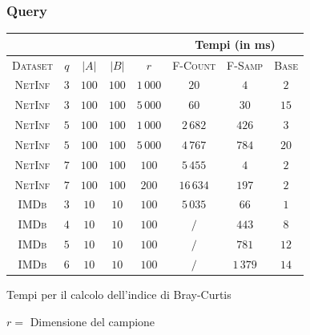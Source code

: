 \begin{frame}
	\frametitle{Query}
	\centering
	\begin{table}[ht]
		\centering
		\begin{tabular}{|c|c|c|c|c|c|c|c|}
			\cline{6-8}
			\multicolumn{5}{c|}{} & \multicolumn{3}{c|}{Tempi (in ms)} \\ \hline
			\textsc{Dataset} & $q$ & $|A|$ & $|B|$ & $r$      & \textsc{F-Count} 	& \textsc{F-Samp} & \textsc{Base} \\ \hline \hline
			\textsc{NetInf}  & $3$ & $100$ & $100$ & $1\,000$ & $20$             	& $4$               & $2$           \\ \hline
			\textsc{NetInf}  & $3$ & $100$ & $100$ & $5\,000$ & $60$             	& $30$              & $15$          \\ \hline \hline
			\textsc{NetInf}  & $5$ & $100$ & $100$ & $1\,000$ & $2\,682$         	& $426$             & $3$           \\ \hline
			\textsc{NetInf}  & $5$ & $100$ & $100$ & $5\,000$ & $4\,767$         	& $784$             & $20$          \\ \hline \hline
			\textsc{NetInf}  & $7$ & $100$ & $100$ & $100$    & $5\,455$ 			& $4$               & $2$           \\ \hline
			\textsc{NetInf}  & $7$ & $100$ & $100$ & $200$    & $16\,634$        	& $197$             & $2$           \\ \hline \hline
			\textsc{IMDb}    & $3$ & $10$  & $10$  & $100$    & $5\,035$         	& $66$              & $1$           \\ \hline
			\textsc{IMDb}    & $4$ & $10$  & $10$  & $100$    & $/$              	& $443$             & $8$           \\ \hline
			\textsc{IMDb}    & $5$ & $10$  & $10$  & $100$    & $/$              	& $781$             & $12$          \\ \hline
			\textsc{IMDb}    & $6$ & $10$  & $10$  & $100$    & $/$              	& $1\,379$          & $14$          \\ \hline
		\end{tabular}
		\medskip
		
		Tempi per il calcolo dell'indice di Bray-Curtis
		
		$r =$ Dimensione del campione
	\end{table}
\end{frame}


